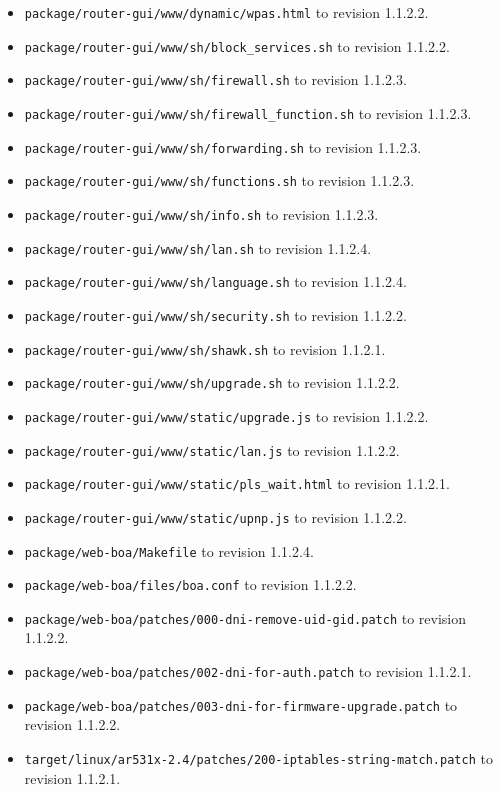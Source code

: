 \documentclass[12pt]{report}
\begin{document}
\begin{itemize}
\begin{enumerate}
\begin{itemize}
  \item \texttt{package/router-gui/www/dynamic/wpas.html} to revision 1.1.2.2.
  \item \texttt{package/router-gui/www/sh/block\_services.sh} to revision 1.1.2.2.
  \item \texttt{package/router-gui/www/sh/firewall.sh} to revision 1.1.2.3.
  \item \texttt{package/router-gui/www/sh/firewall\_function.sh} to revision 1.1.2.3.
  \item \texttt{package/router-gui/www/sh/forwarding.sh} to revision 1.1.2.3.
  \item \texttt{package/router-gui/www/sh/functions.sh} to revision 1.1.2.3.
  \item \texttt{package/router-gui/www/sh/info.sh} to revision 1.1.2.3.
  \item \texttt{package/router-gui/www/sh/lan.sh} to revision 1.1.2.4.
  \item \texttt{package/router-gui/www/sh/language.sh} to revision 1.1.2.4.
  \item \texttt{package/router-gui/www/sh/security.sh} to revision 1.1.2.2.
  \item \texttt{package/router-gui/www/sh/shawk.sh} to revision 1.1.2.1.
  \item \texttt{package/router-gui/www/sh/upgrade.sh} to revision 1.1.2.2.
  \item \texttt{package/router-gui/www/static/upgrade.js} to revision 1.1.2.2.
  \item \texttt{package/router-gui/www/static/lan.js} to revision 1.1.2.2.
  \item \texttt{package/router-gui/www/static/pls\_wait.html} to revision 1.1.2.1.
  \item \texttt{package/router-gui/www/static/upnp.js} to revision 1.1.2.2.
  \item \texttt{package/web-boa/Makefile} to revision 1.1.2.4.
  \item \texttt{package/web-boa/files/boa.conf} to revision 1.1.2.2.
  \item \texttt{package/web-boa/patches/000-dni-remove-uid-gid.patch} to revision 1.1.2.2.
  \item \texttt{package/web-boa/patches/002-dni-for-auth.patch} to revision 1.1.2.1.
  \item \texttt{package/web-boa/patches/003-dni-for-firmware-upgrade.patch} to revision 1.1.2.2.
  \item \texttt{target/linux/ar531x-2.4/patches/200-iptables-string-match.patch} to revision 1.1.2.1.

\end{itemize}
\end{enumerate}
\end{itemize}
\end{document}
